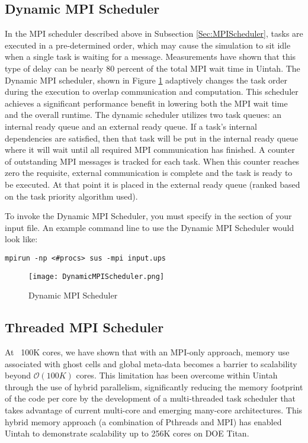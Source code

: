 \subsection{Dynamic MPI Scheduler} \label{Sec:DynamicMPIScheduler}
In the MPI scheduler described above in Subsection \ref{Sec:MPIScheduler},
tasks are executed in a pre-determined order, which may cause the
simulation to sit idle when a single task is waiting for a message.
Measurements have shown that this type of delay can be nearly 80 percent
of the total MPI wait time in Uintah. The Dynamic MPI scheduler, shown in
Figure \ref{fig:DynamicMPIScheduler} adaptively changes the task order during
the execution to overlap communication and computation. This scheduler
achieves
a significant performance benefit in lowering both the MPI wait time and the
overall runtime. The dynamic scheduler utilizes two task queues: an internal
ready queue and an external ready queue. If a task’s internal dependencies are
satisfied, then that task will be put in the internal ready queue where it
will
wait until all required MPI communication has finished. A counter of
outstanding MPI messages is tracked for each task. When this counter reaches
zero the requisite, external communication is complete and the task is ready
to
be executed. At that point it is placed in the external ready queue (ranked
based on the task priority algorithm used).

To invoke the Dynamic MPI Scheduler, you must specify  in
the  section of your input file. An example command line to
use
the Dynamic MPI Scheduler would look like:

\begin{Verbatim}[fontsize=\footnotesize]
mpirun -np <#procs> sus -mpi input.ups
\end{Verbatim}

\begin{figure}[H]
  \centering
  \texttt{[image: DynamicMPIScheduler.png]}
  \caption{Dynamic MPI Scheduler}
  \label{fig:DynamicMPIScheduler}
\end{figure}


\subsection{Threaded MPI Scheduler} \label{Sec:ThreadedMPIScheduler}
At ~100K cores, we have shown that with an MPI-only approach, memory use
associated with ghost cells and global meta-data becomes a
barrier to scalability beyond $\mathcal{O}(100K)$ cores. This limitation has
been overcome within Uintah through the use of hybrid parallelism,
significantly reducing the memory footprint of the code per core by the
development of a multi-threaded task scheduler that takes advantage of current
multi-core and emerging many-core architectures. This hybrid memory approach
(a combination of Pthreads and MPI) has enabled Uintah to demonstrate scalability up to 256K cores on DOE Titan.

